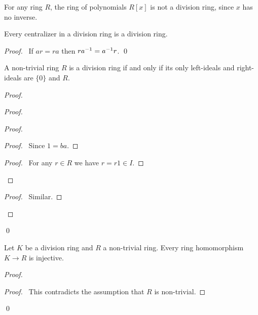 \begin{ex}
For any ring $R$, the ring of polynomials $R[x]$ is not a division ring, since $x$ has no inverse.
\end{ex}

\begin{prop}
Every centralizer in a division ring is a division ring.
\end{prop}

\begin{proof}
\pf\ If $ar = ra$ then $r{a}^{-1} = {a}^{-1}r$. \qed
\end{proof}

\begin{prop}
\label{prop:division-ring-ideals}
A non-trivial ring $R$ is a division ring if and only if its only left-ideals and right-ideals are $\{0\}$ and $R$.
\end{prop}

\begin{proof}
\pf
{}
\begin{proof}
	\begin{proof}
		\begin{proof}
			\pf\ Since $1 = ba$.
		\end{proof}
		\begin{proof}
			\pf\ For any $r \in R$ we have $r = r1 \in I$.
		\end{proof}
	\end{proof}
	\begin{proof}
		\pf\ Similar.
	\end{proof}
\end{proof}
\qed
\end{proof}

\begin{prop}
Let $K$ be a division ring and $R$ a non-trivial ring. Every ring homomorphism $K \rightarrow R$ is injective.
\end{prop}

\begin{proof}
\pf
{}
\qedstep
\begin{proof}
\pf\ This contradicts the assumption that $R$ is non-trivial.
\end{proof}
\qed
\end{proof}

